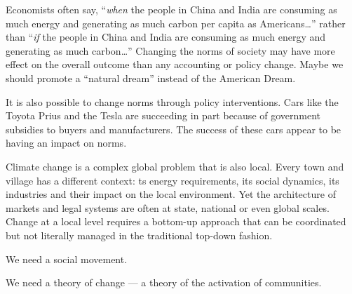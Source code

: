 Economists often say, ``\textit{when} the people in China and India are consuming as much energy and generating as much carbon per capita as Americans…'' rather than ``\textit{if} the people in China and India are consuming as much energy and generating as much carbon…'' Changing the norms of society may have more effect on the overall outcome than any accounting or policy change. Maybe we should promote a ``natural dream'' instead of the American Dream. 

It is also possible to change norms through policy interventions. Cars like the Toyota Prius and the Tesla are succeeding in part because of government subsidies to buyers and manufacturers. The success of these cars appear to be having an impact on norms.

Climate change is a complex global problem that is also local. Every town and village has a different context: ts energy requirements, its social dynamics, its industries and their impact on the local environment. Yet the architecture of markets and legal systems are often at state, national or even global scales. Change at a local level requires a bottom-up approach that can be coordinated but not literally managed in the traditional top-down fashion.

We need a social movement.

We need a theory of change --- a theory of the activation of communities. 
